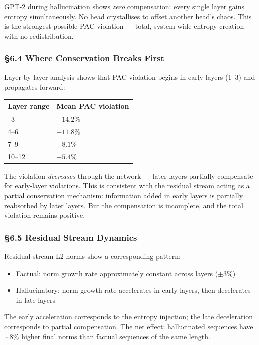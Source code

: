 \documentclass[
  11pt,
  a4paper]{article}
\providecommand{\tightlist}{%
  \setlength{\itemsep}{0pt}\setlength{\parskip}{0pt}}
\begin{document}
GPT-2 during hallucination shows \emph{zero} compensation: every single
layer gains entropy simultaneously. No head crystallises to offset
another head's chaos. This is the strongest possible PAC violation ---
total, system-wide entropy creation with no redistribution.

\subsubsection{§6.4 Where Conservation Breaks
First}\label{where-conservation-breaks-first}

Layer-by-layer analysis shows that PAC violation begins in early layers
(1--3) and propagates forward:

\begin{longtable}[]{@{}ll@{}}
\toprule\noalign{}
Layer range & Mean PAC violation \\
\midrule\noalign{}
\endhead
\bottomrule\noalign{}
\endlastfoot
1--3 & \(+14.2\%\) \\
4--6 & \(+11.8\%\) \\
7--9 & \(+8.1\%\) \\
10--12 & \(+5.4\%\) \\
\end{longtable}

The violation \emph{decreases} through the network --- later layers
partially compensate for early-layer violations. This is consistent with
the residual stream acting as a partial conservation mechanism:
information added in early layers is partially reabsorbed by later
layers. But the compensation is incomplete, and the total violation
remains positive.

\subsubsection{§6.5 Residual Stream
Dynamics}\label{residual-stream-dynamics}

Residual stream L2 norms show a corresponding pattern:

\begin{itemize}
\tightlist
\item
  Factual: norm growth rate approximately constant across layers
  (\(\pm 3\%\))
\item
  Hallucinatory: norm growth rate accelerates in early layers, then
  decelerates in late layers
\end{itemize}

The early acceleration corresponds to the entropy injection; the late
deceleration corresponds to partial compensation. The net effect:
hallucinated sequences have \(\sim 8\%\) higher final norms than factual
sequences of the same length.
\end{document}
